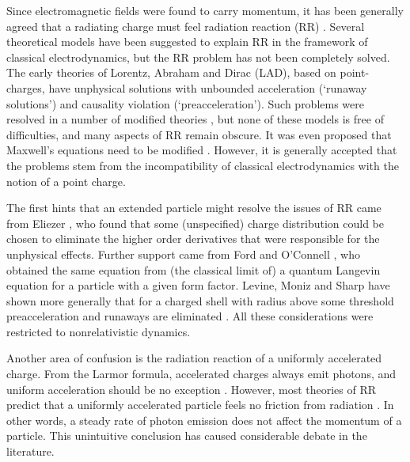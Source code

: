 \documentclass[a4paper,fleqn]{cas-sc}
\begin{document}
Since electromagnetic fields were found to carry momentum, it has been generally agreed that a radiating charge must feel radiation reaction (RR) \cite{Burton2014}. Several theoretical models have been suggested to explain RR in the framework of classical electrodynamics, but the RR problem has not been completely solved. The early theories of Lorentz, Abraham and Dirac (LAD), based on point-charges, have unphysical solutions with unbounded acceleration (`runaway solutions') and causality violation (`preacceleration'). Such problems were resolved in a number of modified theories \cite{Landau1975,Ford1991,Burton2014,Capdessus2016}, but none of these models is free of difficulties, and many aspects of RR remain obscure. It was even proposed that Maxwell's equations need to be modified \cite{Rohrlich1997,Gratus2015}. However, it is generally accepted that the problems stem from the incompatibility of classical electrodynamics with the notion of a point charge.

The first hints that an extended particle might resolve the issues of RR came from Eliezer \cite{Eliezer1948}, who found that some (unspecified) charge distribution could be chosen to eliminate the higher order derivatives that were responsible for the unphysical effects. Further support came from Ford and O'Connell \cite{Ford1991}, who obtained the same equation from (the classical limit of) a quantum Langevin equation for a particle with a given form factor. Levine, Moniz and Sharp  have shown more generally that for a charged shell with radius above some threshold preacceleration and runaways are eliminated \cite{Levine1977}. All these considerations were restricted to nonrelativistic dynamics.

Another area of confusion is the radiation reaction of a uniformly accelerated charge. From the Larmor formula, accelerated charges always emit photons, and uniform acceleration should be no exception \cite{Franklin2014}. However, most theories of RR predict that a uniformly accelerated particle feels no friction from radiation \cite{Fulton1960,Boulware1980,Eriksen2000}. In other words, a steady rate of photon emission does not affect the momentum of a particle. This unintuitive conclusion has caused considerable debate in the literature.
\end{document}
